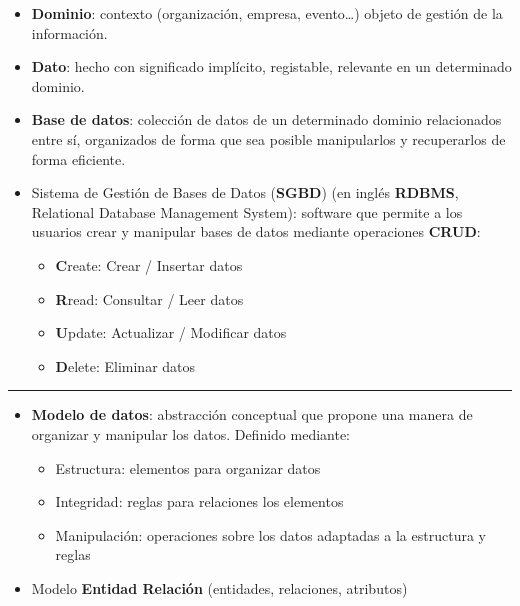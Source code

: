 \documentclass[
]{book}
\providecommand{\tightlist}{%
  \setlength{\itemsep}{0pt}\setlength{\parskip}{0pt}}
\begin{document}
\begin{itemize}
\item
  \textbf{Dominio}: contexto (organización, empresa, evento\ldots) objeto de gestión de la información.
\item
  \textbf{Dato}: hecho con significado implícito, registable, relevante en un determinado dominio.
\item
  \textbf{Base de datos}: colección de datos de un determinado dominio relacionados entre sí, organizados de forma que sea posible manipularlos y recuperarlos de forma eficiente.
\item
  Sistema de Gestión de Bases de Datos (\textbf{SGBD}) (en inglés \textbf{RDBMS}, Relational Database Management System): software que permite a los usuarios crear y manipular bases de datos mediante operaciones \textbf{CRUD}:

  \begin{itemize}
  \tightlist
  \item
    \textbf{C}reate: Crear / Insertar datos
  \item
    \textbf{R}read: Consultar / Leer datos
  \item
    \textbf{U}pdate: Actualizar / Modificar datos
  \item
    \textbf{D}elete: Eliminar datos
  \end{itemize}
\end{itemize}

\begin{center}\rule{0.5\linewidth}{0.5pt}\end{center}

\begin{itemize}
\tightlist
\item
  \textbf{Modelo de datos}: abstracción conceptual que propone una manera de organizar y manipular los datos. Definido mediante:

  \begin{itemize}
  \tightlist
  \item
    Estructura: elementos para organizar datos
  \item
    Integridad: reglas para relaciones los elementos
  \item
    Manipulación: operaciones sobre los datos adaptadas a la estructura y reglas
  \end{itemize}
\item
  Modelo \textbf{Entidad Relación} (entidades, relaciones, atributos)
\end{itemize}
\end{document}
